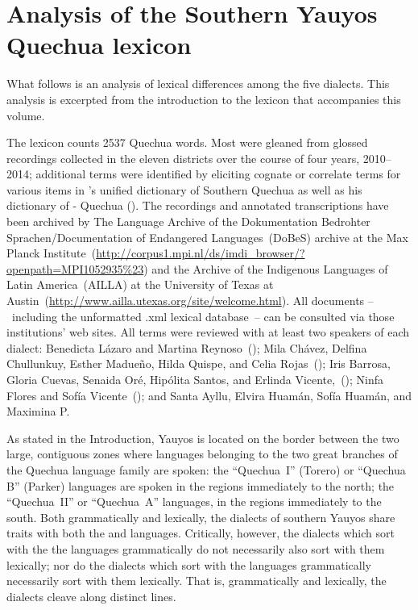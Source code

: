 \chapter{Analysis of the Southern Yauyos Quechua lexicon}

What follows is an analysis of lexical differences among the five dialects. This analysis is excerpted from the introduction to the lexicon that accompanies this volume.

The lexicon counts 2537 Quechua words. Most were gleaned from glossed recordings collected in the eleven districts over the course of four years, 2010--2014; additional terms were identified by eliciting cognate or correlate terms for various items in \citet{CerroP94}'s unified dictionary of Southern Quechua as well as his dictionary of - Quechua (\citet{CerroP76b}). The recordings and annotated transcriptions have been archived by The Language Archive of the Dokumentation Bedrohter Sprachen/Documentation of Endangered Languages~(DoBeS) archive at the Max Planck Institute~(\url{http://corpus1.mpi.nl/ds/imdi_browser/?openpath=MPI1052935\%23}) and the Archive of the Indigenous Languages of Latin America~(AILLA) at the University of Texas at Austin~(\url{http://www.ailla.utexas.org/site/welcome.html}). All documents --~including the unformatted \mbox{.xml} lexical database~-- can be consulted via those institutions’ web sites. All terms were reviewed with at least two speakers of each dialect: Benedicta Lázaro and Martina Reynoso~(\AH); Mila Chávez, Delfina Chullunkuy, Esther Madueño, Hilda Quispe, and Celia Rojas~(\MV); Iris Barrosa, Gloria Cuevas, Senaida Oré, Hipólita Santos, and Erlinda Vicente,~(\CH); Ninfa Flores and Sofía Vicente~(\LT); and Santa Ayllu, Elvira Huamán, Sofía Huamán, and Maximina P. 

As stated in the Introduction, Yauyos is located on the border between the two large, contiguous zones where languages belonging to the two great branches of the Quechua language family are spoken: the “Quechua~I” (Torero) or “Quechua B” (Parker) languages are spoken in the regions immediately to the north; the “Quechua~II” or “Quechua~A” languages, in the regions immediately to the south. Both grammatically and lexically, the dialects of southern Yauyos share traits with both the \QI{} and \QII{} languages. Critically, however, the dialects which sort with the the \QI{} languages grammatically do not necessarily also sort with them lexically; nor do the dialects which sort with the \QII{} languages grammatically necessarily sort with them lexically. That is, grammatically and lexically, the dialects cleave along distinct lines.

